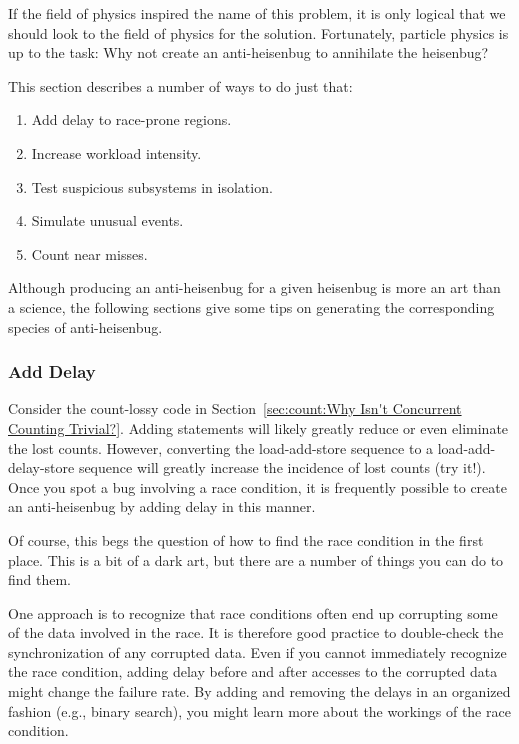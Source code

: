 If the field of physics inspired the name of this problem, it is only
logical that we should look to the field of physics for the solution.
Fortunately, particle physics is up to the task:
Why not create an anti-heisenbug to annihilate the heisenbug?

This section describes a number of ways to do just that:

\begin{enumerate}
\item	Add delay to race-prone regions.
\item	Increase workload intensity.
\item	Test suspicious subsystems in isolation.
\item	Simulate unusual events.
\item	Count near misses.
\end{enumerate}

Although producing an anti-heisenbug for a given heisenbug is more an
art than a science, the following sections give some tips on
generating the corresponding species of anti-heisenbug.

\subsubsection{Add Delay}
\label{sec:debugging:Add Delay}

Consider the count-lossy code in
Section~\ref{sec:count:Why Isn't Concurrent Counting Trivial?}.
Adding  statements will likely greatly reduce or even
eliminate the lost counts.
However, converting the load-add-store sequence to a load-add-delay-store
sequence will greatly increase the incidence of lost counts (try it!).
Once you spot a bug involving a race condition, it is frequently possible
to create an anti-heisenbug by adding delay in this manner.

Of course, this begs the question of how to find the race condition in
the first place.
This is a bit of a dark art, but there are a number of things you can
do to find them.

One approach is to recognize that race conditions often end up corrupting
some of the data involved in the race.
It is therefore good practice to double-check the synchronization of
any corrupted data.
Even if you cannot immediately recognize the race condition, adding
delay before and after accesses to the corrupted data might change
the failure rate.
By adding and removing the delays in an organized fashion (e.g., binary
search), you might learn more about the workings of the race condition.

